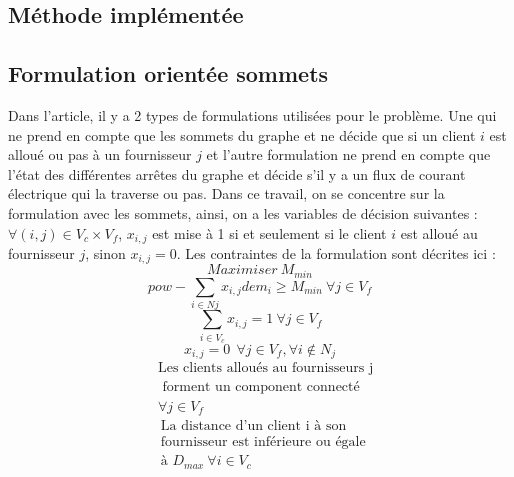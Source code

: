 \documentclass[12pt,a4paper]{article}
\begin{document}
\begin{multicols}{2}
\section{Méthode implémentée}
\subsection{Formulation orientée sommets}
Dans l'article, il y a 2 types de formulations utilisées pour le problème. Une qui ne prend en compte que les sommets du graphe et ne décide que si un client $i$ est alloué ou pas à un fournisseur $j$ et l'autre formulation ne prend en compte que l'état des différentes arrêtes du graphe et décide s'il y a un flux de courant électrique qui la traverse ou pas.\newline\indent
Dans ce travail, on se concentre sur la formulation avec les sommets, ainsi, on a les variables de décision suivantes : $\forall (i,j) \in V_{c}\times V_{f}$, $ x_{i,j}$ est mise à 1 si et seulement si le client $i$ est alloué au fournisseur $j$, sinon $x_{i,j}=0$. Les contraintes de la formulation sont décrites ici :
\begin{equation}\label{eq:Obj}
Maximiser \ M_{min}
\end{equation}
\begin{equation}\label{eq:powDem}
pow -\sum_{i \in N{j}}{x_{i,j}dem_{i}} \geq M_{min} \ \forall j \in V_{f}
\end{equation}
\begin{equation}\label{eq:oneFeeder}
\sum_{i \in V_{c}}{x_{i,j}}=1 \ \forall j \in V_{f}
\end{equation}
\begin{equation}\label{eq:N_j}
x_{i,j}=0 \ \ \forall j \in V_{f},\forall i \notin N_{j}
\end{equation}
\begin{equation}
\begin{aligned}\label{eq:connect}
&\mbox{Les clients alloués au fournisseurs j} \\ 
&\mbox{ forment un component connecté } \\
& \forall j \in V_{f}
\end{aligned}
\end{equation}
\begin{equation}\label{eq:dist}
\begin{aligned}
&\mbox{La distance d'un client i à son}\\ 
&\mbox{fournisseur est inférieure ou égale } \\
& \mbox{à } D_{max} \ \forall i \in V_{c}

\end{aligned}
\end{equation}
\end{multicols}
\end{document}
